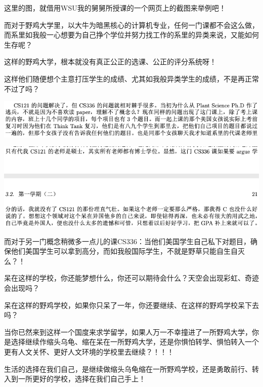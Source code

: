 \documentclass[9pt, b5paper]{article}
\begin{document}
这里的图，就借用WSU我的舅舅所授课的一个网页上的截图来举例吧！

而对于野鸡大学里，以大牛为暗黑核心的计算机专业，任何一门课都不会这么做，而系里如我般一心想要为自己挣个学位并努力找工作的系里的异类来说，又能如何生存呢？

这样的野鸡大学，根本就没有真正公正的选课、公正的评分系统呀！

这样他们随便想个主意打压学生的成绩、尤其如我般异类学生的成绩，不是再正常不过了吗？

\begin{center}
\includegraphics[width=.9\linewidth]{./pic/backups_plans_20210424_210204.png}
\end{center}

\begin{center}
\includegraphics[width=.9\linewidth]{./pic/backups_plans_20210424_210328.png}
\end{center}

而对于另一门概念稍微多一点儿的课CS336：当他们美国学生自己私下对题目，确保他们美国学生可以拿到高分，而如我般国际学生，不就是野草只能自生自灭么？！

呆在这样的学校，你还能梦想什么，你还可以期待会什么？天空会出现彩虹、奇迹会出现吗？

呆在这样的野鸡学校，如果你只呆了一年，你还要继续、在这样的野鸡学校呆下去吗？

当你已然来到这样一个国度来求学留学，如果人万一不幸撞进了一所野鸡大学，你是选择继续作缩头乌龟、缩在呆在一所野鸡大学，还是你惧怕转学、惧怕转入一个更有人文关怀、更好人文环境的学校里去继续？！！！

生活的选择在我们自己，是继续做缩头乌龟缩在一所野鸡学校，还是勇敢前行、转入到一所更好的学校，选择在我们自己手上！
\end{document}
